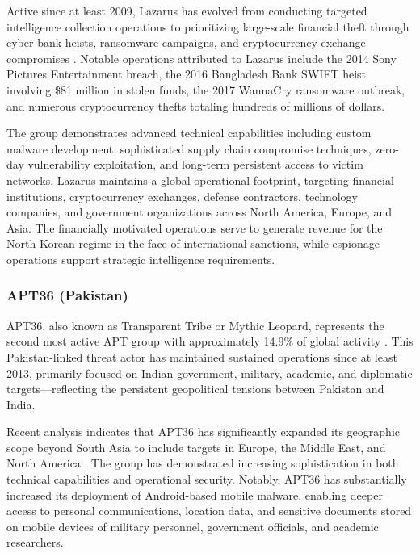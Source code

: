 Active since at least 2009, Lazarus has evolved from conducting targeted intelligence collection operations to prioritizing large-scale financial theft through cyber bank heists, ransomware campaigns, and cryptocurrency exchange compromises \cite{socradar2024}. Notable operations attributed to Lazarus include the 2014 Sony Pictures Entertainment breach, the 2016 Bangladesh Bank SWIFT heist involving \$81 million in stolen funds, the 2017 WannaCry ransomware outbreak, and numerous cryptocurrency thefts totaling hundreds of millions of dollars.

The group demonstrates advanced technical capabilities including custom malware development, sophisticated supply chain compromise techniques, zero-day vulnerability exploitation, and long-term persistent access to victim networks. Lazarus maintains a global operational footprint, targeting financial institutions, cryptocurrency exchanges, defense contractors, technology companies, and government organizations across North America, Europe, and Asia. The financially motivated operations serve to generate revenue for the North Korean regime in the face of international sanctions, while espionage operations support strategic intelligence requirements.

\subsubsection{APT36 (Pakistan)}

APT36, also known as Transparent Tribe or Mythic Leopard, represents the second most active APT group with approximately 14.9\% of global activity \cite{trellix2025}. This Pakistan-linked threat actor has maintained sustained operations since at least 2013, primarily focused on Indian government, military, academic, and diplomatic targets—reflecting the persistent geopolitical tensions between Pakistan and India.

Recent analysis indicates that APT36 has significantly expanded its geographic scope beyond South Asia to include targets in Europe, the Middle East, and North America \cite{brandefense2025}. The group has demonstrated increasing sophistication in both technical capabilities and operational security. Notably, APT36 has substantially increased its deployment of Android-based mobile malware, enabling deeper access to personal communications, location data, and sensitive documents stored on mobile devices of military personnel, government officials, and academic researchers.

